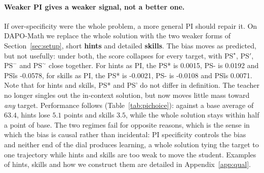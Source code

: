 \documentclass{article}
\newcommand{\pibias}{\mathrm{PS}}            %
\begin{document}
\paragraph{Weaker PI gives a weaker signal, not a better one.}
\label{sec:pichoice}
If over-specificity were the whole problem, a more general PI should repair it. On DAPO-Math we replace the whole solution with the two weaker forms of Section~\ref{sec:setup}, short \textbf{hints} and detailed \textbf{skills}. The bias moves as predicted, but not usefully: under both, the score collapses for every target, with $\pibias^{\star}$, $\pibias'$, $\pibias^{-}$ and $\pibias^{\sim}$ close together. For hints as PI, the PS* is 0.0015, PS- is 0.0192 and PS\~ is -0.0578, for skills as PI, the PS* is -0.0021, PS- is -0.0108 and PS\~ is 0.0071. Note that for hints and skills, PS* and PS' do not differ in definition. The teacher no longer singles out the in-context solution, but now moves little mass toward \emph{any} target. Performance follows (Table~\ref{tab:pichoice}): against a base average of $63.4$, hints lose $5.1$ points and skills $3.5$, while the whole solution stays within half a point of base. The two regimes fail for opposite reasons, which is the sense in which the bias is causal rather than incidental: PI specificity controls the bias and neither end of the dial produces learning, a whole solution tying the target to one trajectory while hints and skills are too weak to move the student. Examples of hints, skills and how we construct them are detailed in Appendix~\ref{app:qual}.


\end{document}
